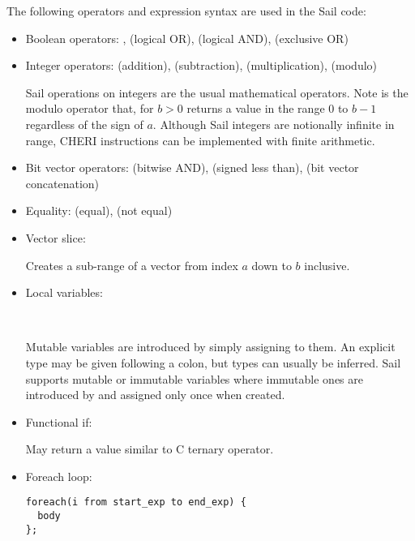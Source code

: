 The following operators and expression syntax are used in the Sail code:

\begin{itemize}
\item \label{sailRISCVznot}\label{sailMIPSznot}Boolean operators:
, \isail{|} (logical OR), \isail{&} (logical AND), \isail{^} (exclusive OR)

\item Integer operators:
\isail{+} (addition), \isail{-} (subtraction), \isail{*} (multiplication), \isail{\%} (modulo)

Sail operations on integers are the usual mathematical operators. Note  is the modulo operator that, for $b > 0$ returns a value in the range $0$ to $b-1$ regardless of the sign of $a$. Although Sail integers are notionally infinite in range, CHERI instructions can be implemented with finite arithmetic.

\item Bit vector operators:
\isail{&} (bitwise AND),  (signed less than),  (bit vector concatenation)

\item Equality:
\isail{==} (equal), \isail{!=} (not equal)

\item Vector slice:


Creates a sub-range of a vector from index $a$ down to $b$ inclusive.

\item Local variables:

   \\

Mutable variables are introduced by simply assigning to them. An explicit type may be given following a colon, but types can usually be inferred. Sail supports mutable or immutable variables where immutable ones are introduced by  and assigned only once when created.

\item Functional if:


May return a value similar to C ternary operator.


\item Foreach loop:

\begin{lstlisting}[language=sail,label=sailMIPSzto]
foreach(i from start_exp to end_exp) {
  body
};
\end{lstlisting}


\end{itemize}
